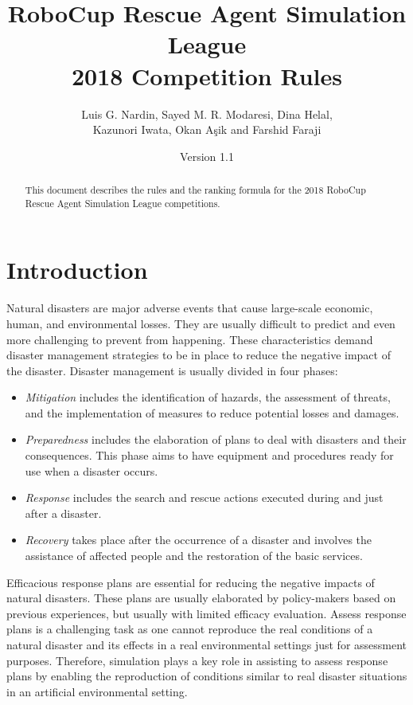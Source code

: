 \documentclass{article}
\begin{document}
\title{RoboCup Rescue Agent Simulation League\\
       2018 Competition Rules}
\author{Luis G. Nardin, Sayed M. R. Modaresi, Dina Helal,\\
Kazunori Iwata, Okan A{\c s}ik and Farshid Faraji}
\date{Version 1.1}
\maketitle
\begin{abstract}
This document describes the rules and the ranking formula for the 2018 RoboCup 
Rescue Agent Simulation League competitions.
\end{abstract}
\section{Introduction}
\label{sec:introduction}
Natural disasters are major adverse events that cause large-scale economic, 
human, and environmental losses. They are usually difficult to predict and even 
more challenging to prevent from happening. These characteristics demand 
disaster management strategies to be in place to reduce the negative impact of 
the disaster. Disaster management is usually divided in four phases:
\begin{itemize}
\item \emph{Mitigation} includes the identification of hazards, the assessment 
of threats, and the implementation of measures to reduce potential losses and 
damages.
\item \emph{Preparedness} includes the elaboration of plans to deal with  
disasters and their consequences. This phase aims to have equipment and 
procedures ready for use when a disaster occurs.
\item \emph{Response} includes the search and rescue actions executed during 
and just after a disaster.
\item \emph{Recovery} takes place after the occurrence of a disaster and 
involves the assistance of affected people and the restoration of the basic 
services.
\end{itemize}
  
Efficacious response plans are essential for reducing the negative impacts of 
natural disasters. These plans are usually elaborated by policy-makers based on 
previous experiences, but usually with limited efficacy evaluation. Assess
response plans is a challenging task as one cannot reproduce the real conditions
of a natural disaster and its effects in a real environmental settings just for
assessment purposes. Therefore, simulation plays a key role in assisting to
assess response plans by enabling the reproduction of conditions similar to
real disaster situations in an artificial environmental setting.
\end{document}
